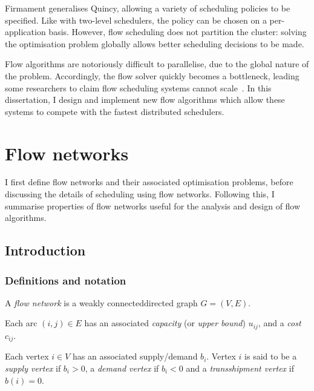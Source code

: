 Firmament generalises Quincy, allowing a variety of scheduling policies to be specified. Like with two-level schedulers, the policy can be chosen on a per-application basis. However, flow scheduling does not partition the cluster: solving the optimisation problem globally allows better scheduling decisions to be made.

Flow algorithms are notoriously difficult to parallelise, due to the global nature of the problem. Accordingly, the flow solver quickly becomes a bottleneck, leading some researchers to claim flow scheduling systems cannot scale~\cite[\S6]{Apollo}. In this dissertation, I design and implement new flow algorithms which allow these systems to compete with the fastest distributed schedulers.

\section{Flow networks} \label{sec:prep-flow}

I first define flow networks and their associated optimisation problems, before discussing the details of scheduling using flow networks. Following this, I summarise properties of flow networks useful for the analysis and design of flow algorithms.

\subsection{Introduction}


\subsubsection{Definitions and notation}

A \emph{flow network} is a weakly connected\footnotemark directed graph $G=(V,E)$.

Each arc $(i,j)\in E$ has an associated \emph{capacity} (or \emph{upper	bound}\footnotemark) $u_{ij}$, and a \emph{cost} $c_{ij}$.

Each vertex $i\in V$ has an associated supply/demand $b_{i}$. Vertex $i$ is said to be a \emph{supply vertex} if $b_{i}>0$, a \emph{demand vertex} if $b_{i}<0$ and a \emph{transshipment vertex} if $b(i)=0$.

